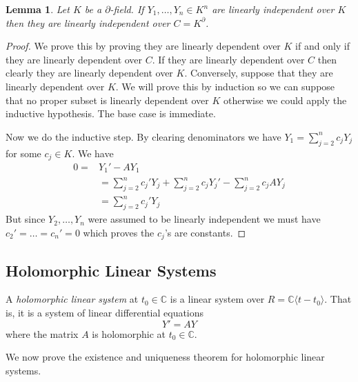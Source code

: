 \documentclass[12pt]{book}
\numberwithin{equation}{section}
\newtheorem{lemma}[theorem]{Lemma}
\theoremstyle{definition}
\theoremstyle{remark}
\newcommand{\CC}{\mathbb{C}}
\begin{document}
\begin{lemma}\label{L:linear-independence}
	Let $K$ be a $\partial$-field. 
	If $Y_1,\ldots,Y_n \in K^n$ are linearly independent over $K$ then they are linearly independent over $C=K^{\partial}$. 
\end{lemma}
\begin{proof}
	We prove this by proving they are linearly dependent over $K$ if and only if they are linearly dependent over $C$.
	If they are linearly dependent over $C$ then clearly they are linearly dependent over $K$. 
	Conversely, suppose that they are linearly dependent over $K$.
	We will prove this by induction so we can suppose that no proper subset is linearly dependent over $K$ otherwise we could apply the inductive hypothesis. 
	The base case is immediate. 
	
	Now we do the inductive step. 
	By clearing denominators we have $Y_1 = \sum_{j=2}^n c_j Y_j$ for some $c_j \in K$.
	We have 
	\begin{align*}
	0=&Y_1'-AY_1 \\
	&= \sum_{j=2}^n c_j' Y_j + \sum_{j=2}^n c_jY_j' - \sum_{j=2}^n c_j AY_j\\
	&= \sum_{j=2}^n c_j' Y_j 
	\end{align*}
	But since $Y_2,\ldots,Y_n$ were assumed to be linearly independent we must have $c_2'=\ldots=c_n'=0$ which proves the $c_j$'s are constants. 
\end{proof}
 
 \subsection{Holomorphic Linear Systems}
A \emph{holomorphic linear system} at $t_0 \in \CC$ is a linear system over $R= \CC\langle t -t_0\rangle$. 
That is, it is a system of linear differential equations 
$$ Y' = AY $$
where the matrix $A$ is holomorphic at $t_0\in \CC$.
 
 We now prove the existence and uniqueness theorem for holomorphic linear systems.
 
\end{document}
